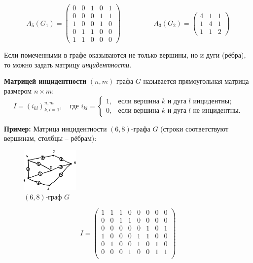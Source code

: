 \documentclass[12pt, a4paper]{article}
\begin{document}
\[A_5(G_1) = \begin{pmatrix}
0 & 0 & 1 & 0 & 1 \\ 0 & 0 & 0 & 1 & 1 \\ 1 & 0 & 0 & 1 & 0 \\ 0 & 1 & 1 & 0 & 0 \\ 1 & 1 & 0 & 0 & 0 
\end{pmatrix} \hspace{2cm}
A_3(G_2) = \begin{pmatrix}
4 & 1 & 1 \\ 1 & 4 & 1 \\ 1 & 1 & 2
\end{pmatrix} \]

Если помеченными в графе оказываются не только вершины, но и дуги (рёбра), то можно задать матрицу \textit{инцидентности}.

\textbf{Матрицей инцидентности} $(n,m)$-графа $G$ называется прямоугольная матрица размером $n \times m$:
\[I = \left( i_{kl} \right)_{k,l=1}^{n,m}, \quad \textrm{где } i_{kl} = \begin{cases} 1, & \textrm{если вершина } k \textrm{ и дуга } l \textrm{ инцидентны}; \\ 0, & \textrm{если вершина } k \textrm{ и дуга } l \textrm{ не инцидентны}. \end{cases} \]

\textbf{Пример:} Матрица инцидентности $(6,8)$-графа $G$ (строки соответствуют вершинам, столбцы -- рёбрам):

\begin{figure}
  \centering
  \vspace{-10mm}
  \includegraphics[width=0.25\textwidth]{45}
  \vspace{-8mm}
 \caption{$(6,8)$-граф $G$}
\end{figure}

\[I = \begin{pmatrix}
1 & 1 & 1 & 0 & 0 & 0 & 0 & 0 \\
0 & 0 & 1 & 1 & 0 & 0 & 0 & 0 \\
0 & 0 & 0 & 0 & 0 & 1 & 0 & 1 \\
1 & 0 & 0 & 0 & 1 & 1 & 0 & 0 \\
0 & 1 & 0 & 0 & 1 & 0 & 1 & 0 \\
0 & 0 & 0 & 1 & 0 & 0 & 1 & 1 \\
\end{pmatrix} \]
\end{document}
